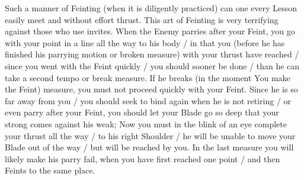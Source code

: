 \newpage


\newpage



Such a manner  of Feinting (when it is diligently practiced) can one
every Lesson easily meet and without effort thrust. This art of
Feinting is very terrifying against those who use invites. When the
Enemy parries after your Feint, you go with your point in a line all
the way to his body / in that you (before he has finished his
parrying motion or broken measure) with your thrust have reached /
since you went with the Feint quickly / you should sooner be done /
than he can take a second tempo or break measure. If he breaks (in the
moment You make the Feint) measure, you must not proceed quickly with
your Feint. Since he is so far away from you / you should seek to bind
again when he is not retiring / or even parry after your Feint, you
should let your Blade go so deep that your strong comes against his
weak; Now you must in the blink of an eye complete your thrust all the
way / to his right Shoulder / he will be unable to move your Blade out
of the way / but will be reached by you. In the last measure you will
likely make his parry fail, when you have first reached one point /
and then Feints to the same place.

